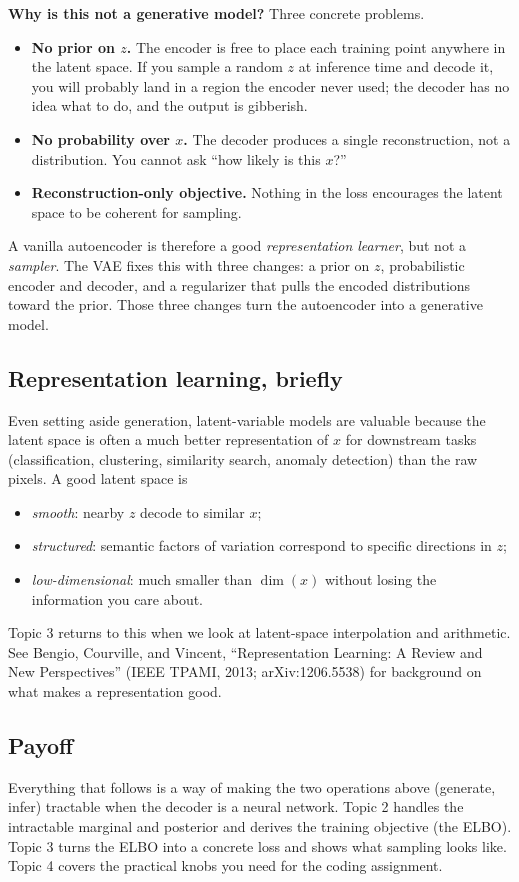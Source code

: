 \documentclass[11pt]{article}
\theoremstyle{remark}
\begin{document}
\textbf{Why is this not a generative model?} Three concrete problems.
\begin{itemize}[leftmargin=1.2em]
  \item \textbf{No prior on $z$.} The encoder is free to place each training point anywhere in the latent space. If you sample a random $z$ at inference time and decode it, you will probably land in a region the encoder never used; the decoder has no idea what to do, and the output is gibberish.
  \item \textbf{No probability over $x$.} The decoder produces a single reconstruction, not a distribution. You cannot ask ``how likely is this $x$?''
  \item \textbf{Reconstruction-only objective.} Nothing in the loss encourages the latent space to be coherent for sampling.
\end{itemize}
A vanilla autoencoder is therefore a good \emph{representation learner}, but not a \emph{sampler}. The VAE fixes this with three changes: a prior on $z$, probabilistic encoder and decoder, and a regularizer that pulls the encoded distributions toward the prior. Those three changes turn the autoencoder into a generative model.

\subsection{Representation learning, briefly}
Even setting aside generation, latent-variable models are valuable because the latent space is often a much better representation of $x$ for downstream tasks (classification, clustering, similarity search, anomaly detection) than the raw pixels. A good latent space is
\begin{itemize}[leftmargin=1.2em]
  \item \emph{smooth}: nearby $z$ decode to similar $x$;
  \item \emph{structured}: semantic factors of variation correspond to specific directions in $z$;
  \item \emph{low-dimensional}: much smaller than $\dim(x)$ without losing the information you care about.
\end{itemize}
Topic 3 returns to this when we look at latent-space interpolation and arithmetic. See Bengio, Courville, and Vincent, ``Representation Learning: A Review and New Perspectives'' (IEEE TPAMI, 2013; arXiv:1206.5538) for background on what makes a representation good.

\subsection{Payoff}
Everything that follows is a way of making the two operations above (generate, infer) tractable when the decoder is a neural network. Topic 2 handles the intractable marginal and posterior and derives the training objective (the ELBO). Topic 3 turns the ELBO into a concrete loss and shows what sampling looks like. Topic 4 covers the practical knobs you need for the coding assignment.
\end{document}
